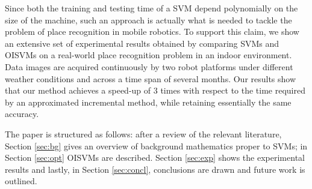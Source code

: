 Since both the training and testing time of a SVM depend polynomially
on the size of the machine, such an approach is actually what is needed to tackle the
problem of place recognition in mobile robotics. To support this
claim, we show an extensive set of experimental results obtained by
comparing SVMs and OISVMs 
on a real-world place recognition problem in an indoor
environment. Data images are acquired continuously by two robot
platforms under different weather conditions and across a time span of
several months. Our results show that our method achieves a speed-up of
$3$ times with respect to the time required by an approximated
incremental method, while retaining essentially the same accuracy.

The paper is structured as follows: after a review of the relevant
literature, Section \ref{sec:bg} gives an overview of background
mathematics proper to SVMs; in Section \ref{sec:opt} OISVMs are
described. Section \ref{sec:exp} shows the experimental results and
lastly, in Section \ref{sec:concl}, conclusions are drawn and future
work is outlined.
